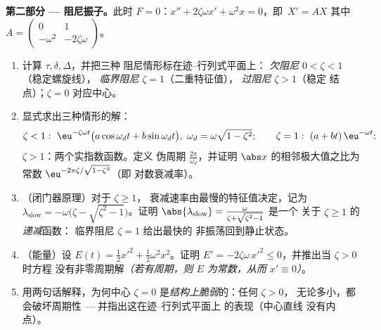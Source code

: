 \begin{problem}
\medskip
\noindent\textbf{第二部分 --- 阻尼振子。}此时 $F =
0$：$x'' + 2\zeta\omega x' + \omega^2x = 0$，即\ $X' = AX$
其中 $A = \begin{pmatrix} 0 & 1\\ -\omega^2 &
-2\zeta\omega\end{pmatrix}$。
\begin{enumerate}[resume]
  \item 计算 $\tau, \delta, \Delta$，并把三种
        阻尼情形标在迹--行列式平面上：
        \emph{欠阻尼} $0 < \zeta < 1$（稳定螺旋线），
        \emph{临界阻尼} $\zeta = 1$（二重特征值），
        \emph{过阻尼} $\zeta > 1$（稳定
        结点）；$\zeta = 0$ 对应中心。
  \item 显式求出三种情形的解：
        \[
        \zeta < 1:\ \eu^{-\zeta\omega t}\bigl(a\cos\omega_d t
        + b\sin\omega_dt\bigr),\ \omega_d =
        \omega\sqrt{1-\zeta^2};
        \qquad
        \zeta = 1:\ (a + bt)\,\eu^{-\omega t};
        \]
        $\zeta > 1$：两个实指数函数。定义
        伪周期 $\frac{2\pi}{\omega_d}$，并证明
        $\abs x$ 的相邻极大值之比为
        常数 $\eu^{-2\pi\zeta/\sqrt{1-\zeta^2}}$（即
        对数衰减率）。
  \item （闭门器原理）对于 $\zeta \geq 1$，
        衰减速率由最慢的特征值决定，记为
        $\lambda_{\mathrm{slow}} = -\omega\bigl(\zeta -
        \sqrt{\zeta^2-1}\bigr)$。证明
        $\abs{\lambda_{\mathrm{slow}}} =
        \frac{\omega}{\zeta + \sqrt{\zeta^2 - 1}}$ 是一个
        关于 $\zeta \geq 1$ 的\emph{递减}函数：
        临界阻尼 $\zeta = 1$ 给出最快的
        非振荡回到静止状态。
  \item （能量）设 $E(t) = \frac12x'^2 +
        \frac12\omega^2x^2$。证明 $E' = -2\zeta\omega\,x'^2
        \leq 0$，并推出当 $\zeta > 0$ 时方程
        没有非零周期解\emph{（若有周期，则 $E$
        为常数，从而 $x' \equiv 0$）}。
  \item 用两句话解释，为何中心 $\zeta = 0$
        是\emph{结构上脆弱}的：任何 $\zeta > 0$，
        无论多小，都会破坏周期性 --- 并指出这在迹--行列式平面上
        的表现（中心直线
        没有内点）。
\end{enumerate}


\end{problem}
